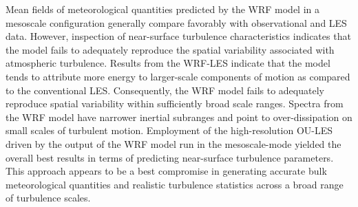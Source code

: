 \documentclass[letter,12pt,dissertation]{OUdissertation6}
\begin{document}
\begin{preface}
Mean fields of meteorological quantities predicted by the WRF model in a mesoscale configuration generally compare favorably with observational and LES data. However, inspection of near-surface turbulence characteristics indicates that the model fails to adequately reproduce the spatial variability associated with atmospheric turbulence. Results from the WRF-LES indicate that the model tends to attribute more energy to larger-scale components of motion as compared to the conventional LES. Consequently, the WRF model fails to adequately reproduce spatial variability within sufficiently broad scale ranges. Spectra from the WRF model have narrower inertial subranges and point to over-dissipation on small scales of turbulent motion. Employment of the high-resolution OU-LES driven by the output of the WRF model run in the mesoscale-mode yielded the overall best results in terms of predicting near-surface turbulence parameters. This approach appears to be a best compromise in generating accurate bulk meteorological quantities and realistic turbulence statistics across a broad range of turbulence scales.
\end{preface}
\end{document}
